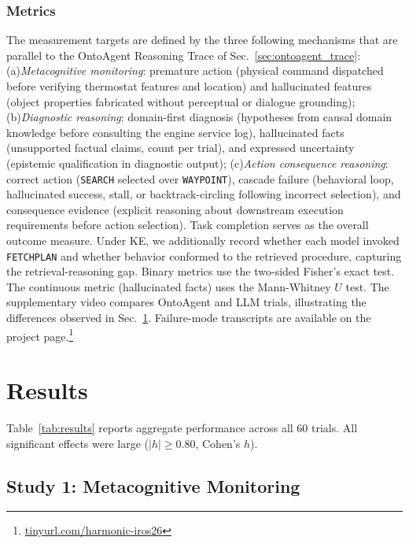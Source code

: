 \documentclass[letterpaper, 10 pt, conference]{ieeeconf}  %
\begin{document}
\subsubsection{Metrics}
The measurement targets are defined by the three following mechanisms that are parallel to the OntoAgent Reasoning Trace of Sec.~\ref{sec:ontoagent_trace}:
(a)\textit{Metacognitive monitoring}: premature action (physical command dispatched before verifying thermostat features and location) and hallucinated features (object properties fabricated without perceptual or dialogue grounding); (b)\textit{Diagnostic reasoning}: domain-first diagnosis (hypotheses from causal domain knowledge before consulting the engine service log), hallucinated facts (unsupported factual claims, count per trial), and expressed uncertainty (epistemic qualification in diagnostic output); (c)\textit{Action consequence reasoning}: correct action (\texttt{SEARCH} selected over \texttt{WAYPOINT}), cascade failure (behavioral loop, hallucinated success, stall, or backtrack-circling following incorrect selection), and consequence evidence (explicit reasoning about downstream execution requirements before action selection). Task completion serves as the overall outcome measure. Under KE, we additionally record whether each model invoked \texttt{FETCHPLAN} and whether behavior conformed to the retrieved procedure, capturing the retrieval-reasoning gap. Binary metrics use the two-sided Fisher's exact test. The continuous metric (hallucinated facts) uses the Mann-Whitney $U$ test. The supplementary video compares OntoAgent and LLM trials, illustrating the differences observed in Sec.~\ref{sec:results}. Failure-mode transcripts are available on the project page.\footnote{\href{https://tinyurl.com/harmonic-iros26}{tinyurl.com/harmonic-iros26}}




\section{Results}
\label{sec:results}

Table~\ref{tab:results} reports aggregate performance 
across all 60 trials. All significant effects were large 
($|h| \geq 0.80$, Cohen's $h$).

\subsection{Study 1: Metacognitive Monitoring}
\end{document}
